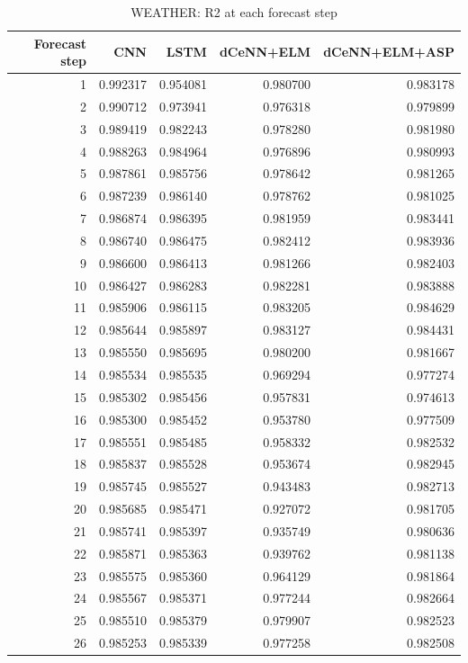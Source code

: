 \begin{table}
\caption{WEATHER: R2 at each forecast step}
\begin{tabular}{rrrrr}
\toprule
Forecast step & CNN & LSTM & dCeNN+ELM & dCeNN+ELM+ASP \\
\midrule
1 & 0.992317 & 0.954081 & 0.980700 & 0.983178 \\
2 & 0.990712 & 0.973941 & 0.976318 & 0.979899 \\
3 & 0.989419 & 0.982243 & 0.978280 & 0.981980 \\
4 & 0.988263 & 0.984964 & 0.976896 & 0.980993 \\
5 & 0.987861 & 0.985756 & 0.978642 & 0.981265 \\
6 & 0.987239 & 0.986140 & 0.978762 & 0.981025 \\
7 & 0.986874 & 0.986395 & 0.981959 & 0.983441 \\
8 & 0.986740 & 0.986475 & 0.982412 & 0.983936 \\
9 & 0.986600 & 0.986413 & 0.981266 & 0.982403 \\
10 & 0.986427 & 0.986283 & 0.982281 & 0.983888 \\
11 & 0.985906 & 0.986115 & 0.983205 & 0.984629 \\
12 & 0.985644 & 0.985897 & 0.983127 & 0.984431 \\
13 & 0.985550 & 0.985695 & 0.980200 & 0.981667 \\
14 & 0.985534 & 0.985535 & 0.969294 & 0.977274 \\
15 & 0.985302 & 0.985456 & 0.957831 & 0.974613 \\
16 & 0.985300 & 0.985452 & 0.953780 & 0.977509 \\
17 & 0.985551 & 0.985485 & 0.958332 & 0.982532 \\
18 & 0.985837 & 0.985528 & 0.953674 & 0.982945 \\
19 & 0.985745 & 0.985527 & 0.943483 & 0.982713 \\
20 & 0.985685 & 0.985471 & 0.927072 & 0.981705 \\
21 & 0.985741 & 0.985397 & 0.935749 & 0.980636 \\
22 & 0.985871 & 0.985363 & 0.939762 & 0.981138 \\
23 & 0.985575 & 0.985360 & 0.964129 & 0.981864 \\
24 & 0.985567 & 0.985371 & 0.977244 & 0.982664 \\
25 & 0.985510 & 0.985379 & 0.979907 & 0.982523 \\
26 & 0.985253 & 0.985339 & 0.977258 & 0.982508 \\

\end{tabular}
\end{table}
